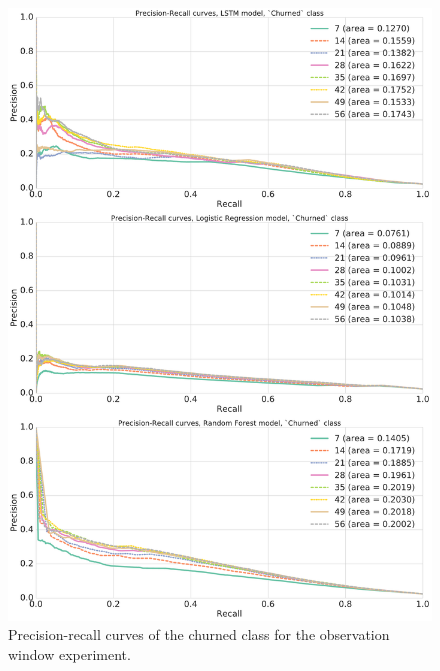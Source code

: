 \documentclass{kththesis}
\begin{document}
\begin{figure}
    \centering
    \includegraphics[width=1.0\textwidth,keepaspectratio]{figures/prc_obs_window.pdf}
    \caption{Precision-recall curves of the churned class for the observation window experiment.}
    \label{fig:prc_obs_window}
\end{figure}
\end{document}
